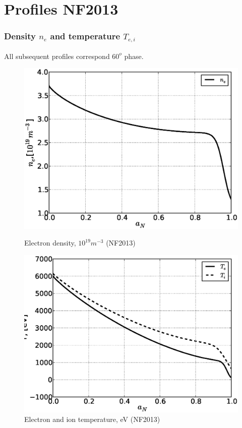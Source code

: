 \documentclass[11pt,oneside,a4paper,notitlepage]{article}
\begin{document}
\newpage
\part{Profiles NF2013}
\section{Density $n_e$ and temperature $T_{e,i}$}
All subsequent profiles correspond $60^o$ phase.
\begin{figure}[h]
\begin{center}
\begin{minipage}[h]{0.4\linewidth} 
 \centering
 \includegraphics[width=1.35\linewidth]{evans60/ne60.eps}
 \caption{Electron density, $10^{19} m^{-3}$ (NF2013)}
 \label{fig:ne60}
\end{minipage}
\hfill
\begin{minipage}[h]{0.4\linewidth}
 \centering
 \includegraphics[width=1.35\linewidth]{evans60/T60.eps}
 \caption{Electron and ion temperature, eV (NF2013)}
 \label{fig:T60}
\end{minipage}
\end{center}
\end{figure}
\end{document}
